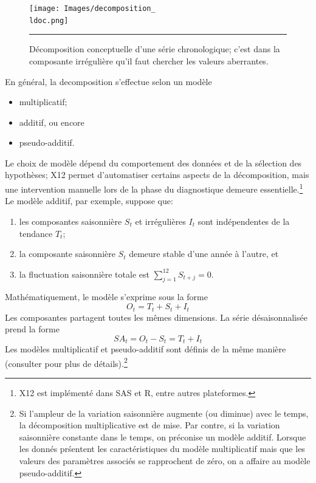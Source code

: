 \begin{Exemple}
\begin{figure}[t]
\centering
\texttt{[image: Images/decomposition\_\\ldoc.png]}
\caption{\small Décomposition conceptuelle d'une série chronologique; c'est dans la composante irrégulière qu'il faut chercher les valeurs aberrantes.}\hrule \label{fig:description}
\end{figure}
\newl En g\'en\'eral, la decomposition s'effectue selon un mod\`ele 
\begin{itemize}[noitemsep]
\item multiplicatif;
\item additif, ou encore 
\item pseudo-additif.
\end{itemize}
Le choix de modèle dépend du comportement des données et de la s\'election des hypothèses; X12 permet d'automatiser certains aspects de la décomposition, mais une intervention manuelle lors de la phase du diagnostique demeure essentielle.\footnote{X12 est implémenté dans SAS et R, entre autres plateformes.}
Le modèle additif, par exemple, suppose que: 
\begin{enumerate}[noitemsep]
\item les composantes saisonni\`ere $S_t$ et irr\'eguli\`eres $I_t$ sont ind\'ependentes de la tendance  $T_t$; 
\item la composante saisonni\`ere $S_t$ demeure stable d'une ann\'ee \`a l'autre, et 
\item la fluctuation saisonni\`ere totale est $\sum_{j=1}^{12} S_{t+j}=0 $.\end{enumerate} 
Mathématiquement, le modèle s'exprime sous la forme
    \begin{equation*}
        O_t = T_t + S_t + I_t
    \end{equation*}
    Les composantes partagent toutes les mêmes dimensions. La série désaisonnalisée prend la forme
    \begin{equation*}
        SA_t = O_t - S_t = T_t + I_t
    \end{equation*}
Les modèles multiplicatif et pseudo-additif sont définis de la même manière (consulter  \cite{TS_FH,TS_FMBOC,TS_ICTSA,TS_SAETS,TS_JL} pour plus de détails).\footnote{Si l'ampleur de la variation saisonnière augmente (ou diminue) avec le temps, la décomposition multiplicative est de mise. Par contre, si la variation saisonnière constante dans le temps, on pr\'econise un modèle additif. Lorsque les donn\'es pr\'sentent les caract\'eristiques du mod\`ele multiplicatif mais que les valeurs des paramètres associ\'es se rapprochent de zéro, on a affaire au mod\`ele pseudo-additif.}\newl 

\end{Exemple}
